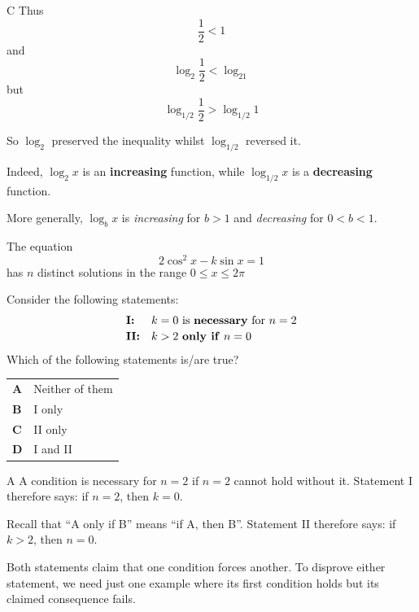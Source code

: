 \documentclass[11pt,a4paper]{article}
\begin{document}
\begin{enumerate}[label=\textbf{\arabic*.},leftmargin=*,itemsep=0pt,start=8]
\begin{djsSolution}{C}
Thus
\[\frac12<1\]
and
\[\log_2\frac12<\log_21\]
but
\[\log_{1/2}\frac12>\log_{1/2}1\]

So $\log_2$ preserved the inequality whilst $\log_{1/2}$ reversed it.

Indeed, $\log_2x$ is an \textbf{increasing} function, while $\log_{1/2}x$ is a \textbf{decreasing} function.

More generally, $\log_bx$ is \emph{increasing} for $b>1$ and \emph{decreasing} for $0<b<1$.
\end{djsSolution}
\end{enumerate}
\clearpage
\thispagestyle{djssolutions}
\vspace*{8pt}
\begin{enumerate}[label=\textbf{\arabic*.},leftmargin=*,itemsep=0pt,start=9]
\questionitem[Trigonometry]
The equation \[ 2\cos^2 x - k\sin x = 1 \] has $n$ distinct solutions in the range $0 \le x \le 2\pi$

Consider the following statements: \[ \begin{array}{@{}l l@{}}
\textbf{I:} & \text{$k = 0$ is \textbf{necessary} for $n = 2$} \\[2pt]
\textbf{II:} & \text{$k > 2$ \textbf{only if} $n = 0$}
\end{array} \]
Which of the following statements is/are true?

\par\vspace*{12pt}
\begin{tabularx}{\linewidth}{@{}>{\bfseries}l Y@{}}
A &
Neither of them
\\[0.8em]
B &
I only
\\[0.8em]
C &
II only
\\[0.8em]
D &
I and II
\\
\end{tabularx}

\begin{djsSolution}{A}
A condition is necessary for $n=2$ if $n=2$ cannot hold without it. Statement I therefore says: if $n=2$, then $k=0$.

Recall that ``A only if B'' means ``if A, then B''. Statement II therefore says: if $k>2$, then $n=0$.

Both statements claim that one condition forces another. To disprove either statement, we need just one example where its first condition holds but its claimed consequence fails.


\end{djsSolution}
\end{enumerate}
\end{document}
